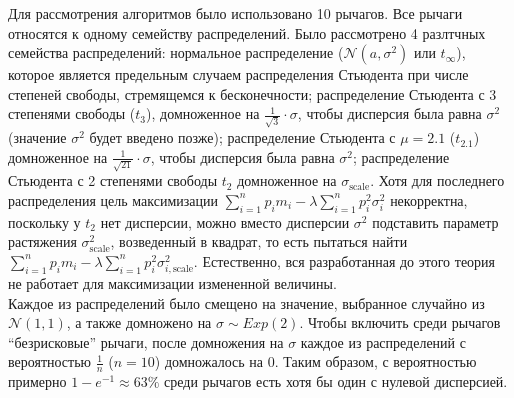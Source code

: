 \documentclass{article}
\begin{document}
Для рассмотрения алгоритмов было использовано 10 рычагов. Все рычаги относятся к одному семейству распределений. Было рассмотрено 4 разлтчных семейства распределений: нормальное распределение ($\mathcal{N}(a,\sigma^2)$ или $t_{\infty}$), которое является предельным случаем распределения Стьюдента при числе степеней свободы, стремящемся к бесконечности; распределение Стьюдента с 3 степенями свободы ($t_3$), домноженное на $\frac{1}{\sqrt{3}} \cdot \sigma$, чтобы дисперсия была равна $\sigma^2$ (значение $\sigma^2$ будет введено позже); распределение Стьюдента с $\mu=2.1$ ($t_{2.1}$) домноженное на $\frac{1}{\sqrt{21}} \cdot \sigma$, чтобы дисперсия была равна $\sigma^2$; распределение Стьюдента с 2 степенями свободы $t_2$ домноженное на $\sigma_{\text{scale}}$. Хотя для последнего распределения цель максимизации $\sum_{i=1}^n p_i m_i - \lambda \sum_{i=1}^n p_i^2 \sigma_i^2$ некорректна, поскольку у $t_2$ нет дисперсии, можно вместо дисперсии $\sigma^2$ подставить параметр растяжения $\sigma_{\text{scale}}^2$, возведенный в квадрат, то есть пытаться найти $\sum_{i=1}^n p_i m_i - \lambda \sum_{i=1}^n p_i^2 \sigma_{i, \text{scale}}^2$. Естественно, вся разработанная до этого теория не работает для максимизации измененной величины. \\
Каждое из распределений было смещено на значение, выбранное случайно из $\mathcal{N}(1,1)$, а также домножено на $\sigma \sim Exp(2)$. Чтобы включить среди рычагов ``безрисковые'' рычаги, после домножения на $\sigma$ каждое из распределений с вероятностью $\frac{1}{n}$ ($n=10$) домножалось на 0. Таким образом, с вероятностью примерно $1 - e^{-1} \approx 63\%$ среди рычагов есть хотя бы один с нулевой дисперсией. \\
\end{document}
